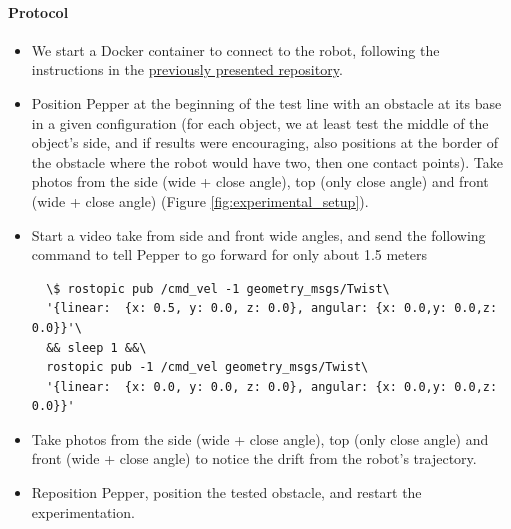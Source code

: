 \paragraph{Protocol}

\begin{itemize}
  \item We start a Docker container to connect to the robot, following the instructions in the \href{https://github.com/Xia0ben/rosdocked-kinetic-pepper}{previously presented repository}.
  \item Position Pepper at the beginning of the test line with an obstacle at its base in a given configuration (for each object, we at least test the middle of the object's side, and if results were encouraging, also positions at the border of the obstacle where the robot would have two, then one contact points). Take photos from the side (wide + close angle), top (only close angle) and front (wide + close angle) (Figure \ref{fig:experimental_setup}).
  \item Start a video take from side and front wide angles, and send the following command to tell Pepper to go forward for only about 1.5 meters
  \begin{verbatim}
  \$ rostopic pub /cmd_vel -1 geometry_msgs/Twist\
  '{linear:  {x: 0.5, y: 0.0, z: 0.0}, angular: {x: 0.0,y: 0.0,z: 0.0}}'\
  && sleep 1 &&\
  rostopic pub -1 /cmd_vel geometry_msgs/Twist\
  '{linear:  {x: 0.0, y: 0.0, z: 0.0}, angular: {x: 0.0,y: 0.0,z: 0.0}}'
  \end{verbatim}
  \item Take photos from the side (wide + close angle), top (only close angle) and front (wide + close angle) to notice the drift from the robot's trajectory.
  \item Reposition Pepper, position the tested obstacle, and restart the experimentation.
\end{itemize}

